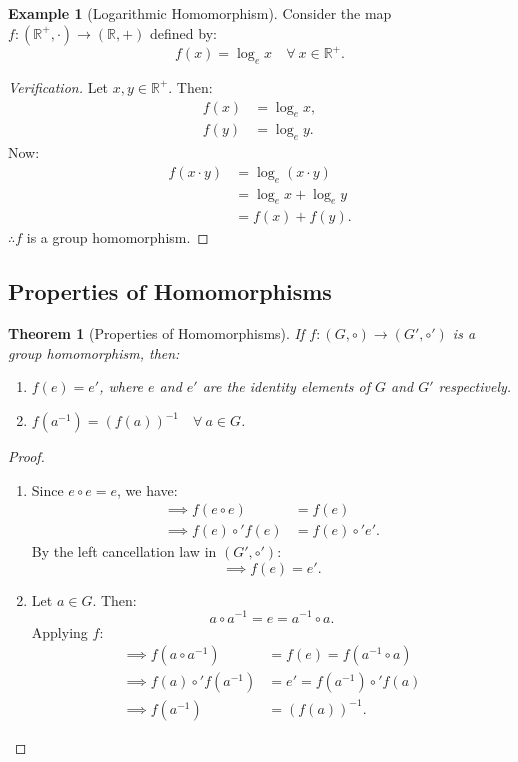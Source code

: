\documentclass[12pt]{article}
\theoremstyle{definition}
\newtheorem{example}[definition]{Example}
\theoremstyle{plain}
\newtheorem{theorem}{Theorem}[section]
\begin{document}
\begin{example}[Logarithmic Homomorphism]
Consider the map $f: (\mathbb{R}^+, \cdot) \longrightarrow (\mathbb{R}, +)$ defined by:
\[
f(x) = \log_e x \quad \forall\ x \in \mathbb{R}^+.
\]
\begin{proof}[Verification]
Let $x, y \in \mathbb{R}^+$. Then:
\begin{align*}
f(x) &= \log_e x, \\
f(y) &= \log_e y.
\end{align*}
Now:
\begin{align*}
f(x \cdot y) &= \log_e (x \cdot y) \\
&= \log_e x + \log_e y \\
&= f(x) + f(y).
\end{align*}
$\therefore f$ is a group homomorphism.
\end{proof}
\end{example}

\subsection{Properties of Homomorphisms}

\begin{theorem}[Properties of Homomorphisms]
If $f: (G, \circ) \longrightarrow (G', \circ')$ is a group homomorphism, then:
\begin{enumerate}
    \item $f(e) = e'$, where $e$ and $e'$ are the identity elements of $G$ and $G'$ respectively.
    \item $f(a^{-1}) = (f(a))^{-1} \quad \forall\ a \in G$.
\end{enumerate}
\end{theorem}

\begin{proof}
\begin{enumerate}
    \item Since $e \circ e = e$, we have:
    \begin{align*}
        \implies f(e \circ e) &= f(e) \\
        \implies f(e) \circ' f(e) &= f(e) \circ' e'.
    \end{align*}
    By the left cancellation law in $(G', \circ')$:
    \[
    \implies f(e) = e'.
    \]

    \item Let $a \in G$. Then:
    \[
    a \circ a^{-1} = e = a^{-1} \circ a.
    \]
    Applying $f$:
    \begin{align*}
        \implies f(a \circ a^{-1}) &= f(e) = f(a^{-1} \circ a) \\
        \implies f(a) \circ' f(a^{-1}) &= e' = f(a^{-1}) \circ' f(a) \\
        \implies f(a^{-1}) &= (f(a))^{-1}.
    \end{align*}
\end{enumerate}
\end{proof}
\end{document}
